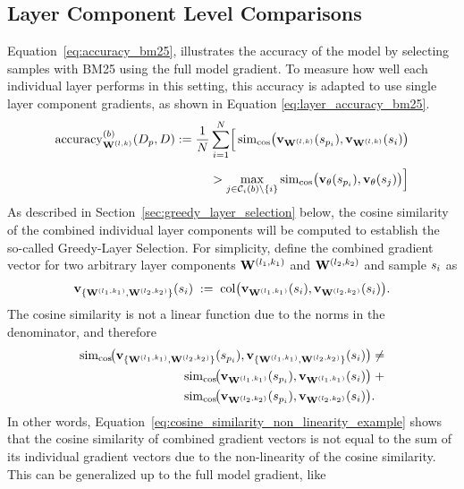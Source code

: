 \subsection{Layer Component Level Comparisons}
Equation~\ref{eq:accuracy_bm25}, illustrates the accuracy of the model by selecting samples with BM25 using the full model gradient. To measure how well each individual layer performs in this setting, this accuracy is adapted to use single layer component gradients, as shown in Equation \ref{eq:layer_accuracy_bm25}.
\begin{equation}
  \begin{split}
    \operatorname{accuracy}^{(b)}_{\Wlk}(D_{p},D)
    := \frac{1}{N}\sum_{i=1}^{N}
        \Bigl[\,
          \simcos\bigl(\vXspi[\Wlk],\vXsi[\Wlk]\bigr)
          \\[4pt]            %
    \quad>
          \max_{j\in\mathcal{C}_{i}(b)\setminus\{i\}}
          \simcos\bigl(\vXspi,\vXsj\bigr)
        \Bigr]
  \end{split}
  \label{eq:layer_accuracy_bm25}
\end{equation}
As described in Section~\ref{sec:greedy_layer_selection} below, the cosine similarity of the combined individual layer components will be computed to establish the so-called Greedy-Layer Selection. For simplicity, define the combined gradient vector for two arbitrary layer components $\Wlonekone$ and $\Wltwoktwo$ and sample $\si$ as
\begin{equation}
\vXsi[\{ \Wlonekone, \Wltwoktwo \}]
\;:=\;
\operatorname{col}\bigl( \vXsi[\Wlonekone], \vXsi[\Wltwoktwo] \bigr).
\end{equation}
The cosine similarity is not a linear function due to the norms in the denominator, and therefore
\begin{equation}
    \begin{split}
        \simcos\!\bigl(\vXspi[\{ \Wlonekone, \Wltwoktwo \}], \vXsi[\{ \Wlonekone, \Wltwoktwo \}] \bigr) & \neq \\
        \simcos\!\bigl(\vXspi[\Wlonekone], \vXsi[\Wlonekone] \bigr) & \; + \\ \simcos\!\bigl(\vXspi[\Wltwoktwo], \vXsi[\Wltwoktwo] \bigr) & .
    \end{split}
    \label{eq:cosine_similarity_non_linearity_example}
\end{equation}
In other words, Equation~\ref{eq:cosine_similarity_non_linearity_example} shows that the cosine similarity of combined gradient vectors is not equal to the sum of its individual gradient vectors due to the non-linearity of the cosine similarity. This can be generalized up to the full model gradient, like
